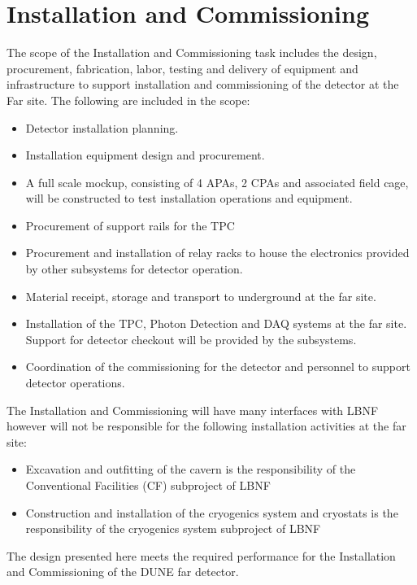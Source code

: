 \section{Installation and Commissioning}
\label{sec:detectors-fd-ref-install}

The scope of the Installation and Commissioning task includes the
design, procurement, fabrication, labor, testing and delivery of
equipment and infrastructure to support installation and commissioning
of the detector at the Far site. The following are included in the
scope:
\begin{itemize}
\item Detector installation planning.
\item Installation equipment design and procurement.
\item A full scale mockup, consisting of 4 APAs, 2 CPAs and associated
  field cage, will be constructed to test installation operations and
  equipment.
\item Procurement of support rails for the TPC
\item Procurement and installation of relay racks to house the
  electronics provided by other subsystems for detector operation.
\item Material receipt, storage and transport to underground at the far site.
\item Installation of the TPC, Photon Detection and DAQ systems at the
  far site.  Support for detector checkout will be provided by the
  subsystems.
\item Coordination of the commissioning for the detector and personnel
  to support detector operations.
\end{itemize}

The Installation and Commissioning will have many interfaces with LBNF
however will not be responsible for the following installation
activities at the far site:
\begin{itemize}
\item Excavation and outfitting of the cavern is the responsibility of
  the Conventional Facilities (CF) subproject of LBNF
\item Construction and installation of the cryogenics system and
  cryostats is the responsibility of the cryogenics system subproject
  of LBNF
\end{itemize}

The design presented here meets the required performance for the
Installation and Commissioning of the DUNE far detector.

